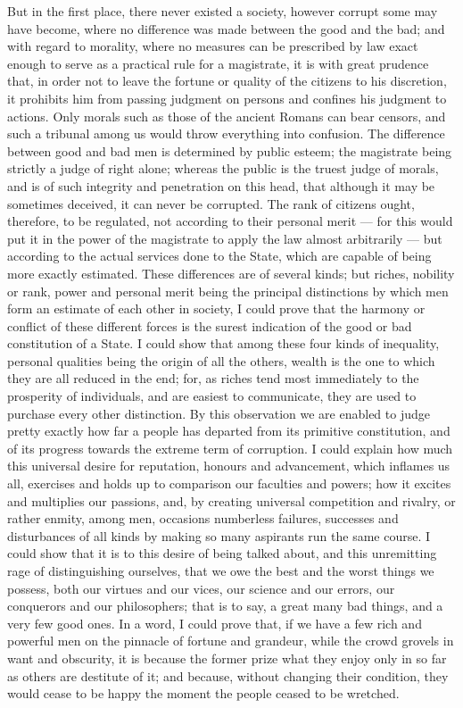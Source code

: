 \documentclass[12pt]{report}
\begin{document}
{But in the first place, there never existed a society, however corrupt some may have become, where no difference was made between the good and the bad; and with regard to morality, where no measures can be prescribed by law exact enough to serve as a practical rule for a magistrate, it is with great prudence that, in order not to leave the fortune or quality of the citizens to his discretion, it prohibits him from passing judgment on persons and confines his judgment to actions. Only morals such as those of the ancient Romans can bear censors, and such a tribunal among us would throw everything into confusion. The difference between good and bad men is determined by public esteem; the magistrate being strictly a judge of right alone; whereas the public is the truest judge of morals, and is of such integrity and penetration on this head, that although it may be sometimes deceived, it can never be corrupted. The rank of citizens ought, therefore, to be regulated, not according to their personal merit — for this would put it in the power of the magistrate to apply the law almost arbitrarily — but according to the actual services done to the State, which are capable of being more exactly estimated.} These differences are of several kinds; but riches, nobility or rank, power and personal merit being the principal distinctions by which men form an estimate of each other in society, I could prove that the harmony or conflict of these different forces is the surest indication of the good or bad constitution of a State. I could show that among these four kinds of inequality, personal qualities being the origin of all the others, wealth is the one to which they are all reduced in the end; for, as riches tend most immediately to the prosperity of individuals, and are easiest to communicate, they are used to purchase every other distinction. By this observation we are enabled to judge pretty exactly how far a people has departed from its primitive constitution, and of its progress towards the extreme term of corruption. I could explain how much this universal desire for reputation, honours and advancement, which inflames us all, exercises and holds up to comparison our faculties and powers; how it excites and multiplies our passions, and, by creating universal competition and rivalry, or rather enmity, among men, occasions numberless failures, successes and disturbances of all kinds by making so many aspirants run the same course. I could show that it is to this desire of being talked about, and this unremitting rage of distinguishing ourselves, that we owe the best and the worst things we possess, both our virtues and our vices, our science and our errors, our conquerors and our philosophers; that is to say, a great many bad things, and a very few good ones. In a word, I could prove that, if we have a few rich and powerful men on the pinnacle of fortune and grandeur, while the crowd grovels in want and obscurity, it is because the former prize what they enjoy only in so far as others are destitute of it; and because, without changing their condition, they would cease to be happy the moment the people ceased to be wretched.
\end{document}
